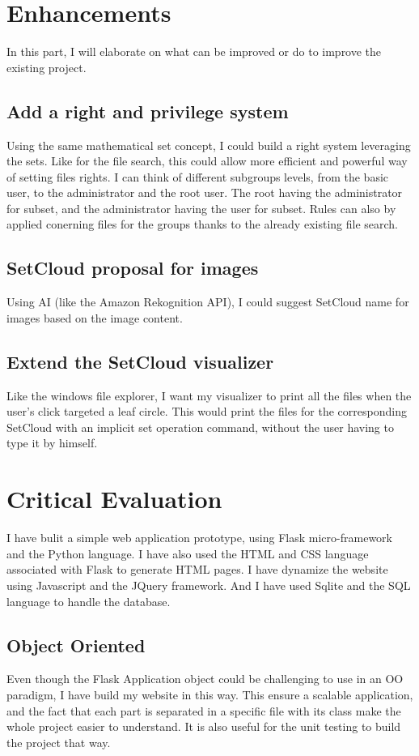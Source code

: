 \documentclass[10pt, a4paper]{article}
\begin{document}
\section{Enhancements}
In this part, I will elaborate on what can be improved or do to improve the existing project.
\subsection{Add a right and privilege system}
Using the same mathematical set concept, I could build a right system leveraging the sets. Like for the file search, this could allow more efficient and powerful way of setting files rights. I can think of different subgroups levels, from the basic user, to the administrator and the root user. The root having  the administrator for subset, and the administrator having the user for subset. Rules can also by applied conerning files for the groups thanks to the already existing file search.
\subsection{SetCloud proposal for images}
Using AI (like the Amazon Rekognition API), I could suggest SetCloud name for images based on the image content.
\subsection{Extend the SetCloud visualizer}
Like the windows file explorer, I want my visualizer to print all the files when the user's click targeted a leaf circle. This would print the files for the corresponding SetCloud with an implicit set operation command, without the user having to type it by himself.

\section{Critical Evaluation}
I have bulit a simple web application prototype, using Flask micro-framework and the Python language. I have also used the HTML and CSS language associated with Flask to generate HTML pages. I have dynamize the website using Javascript and the JQuery framework. And I have used Sqlite and the SQL language to handle the database.
\subsection{Object Oriented}
Even though the Flask Application object could be challenging to use in an OO paradigm, I have build my website in this way. This ensure a scalable application, and the fact that each part is separated in a specific file with its class make the whole project easier to understand. It is also useful for the unit testing to build the project that way.
\end{document}
